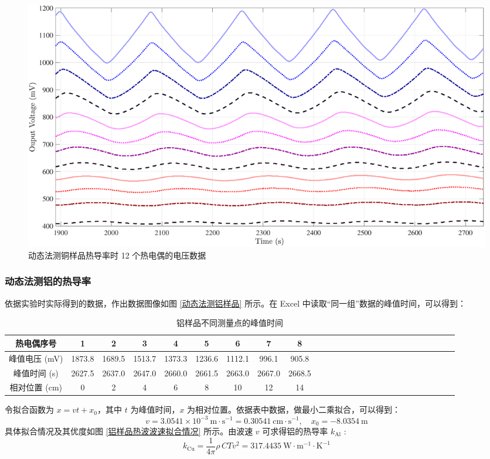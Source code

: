\documentclass[UTF8]{article}
\theoremstyle{MyLineTheoremStyle} %
\theoremstyle{MyBlockTheoremStyle} %
\theoremstyle{MySubsubsectionStyle} %
\begin{document}
\begin{figure}[H]\centering
    \includegraphics[width=\columnwidth]{assets/1 铜/2024-12-10_20-43-29.pdf}
    \caption{动态法测铜样品热导率时 12 个热电偶的电压数据}
    \label{动态法测铜样品}
\end{figure}





\subsubsection{动态法测铝的热导率}



依据实验时实际得到的数据，作出数据图像如图 \ref{动态法测铝样品} 所示。在 Excel 中读取“同一组”数据的峰值时间，可以得到：
\begin{table}[H]\centering
    \caption{铝样品不同测量点的峰值时间}
    \label{铝样品不同测量点的峰值时间}
    \begin{tabular}{cccccccccccccccccccccccccc}\toprule
        热电偶序号 & 1 & 2 & 3 & 4 & 5 & 6 & 7 & 8 \\
        \midrule
        峰值电压 (mV) &1873.8&	1689.5&	1513.7&	1373.3&	1236.6&	1112.1&	996.1 & 905.8 \\
        峰值时间 (s) &2627.5&	2637.0&	2647.0&	2660.0&	2661.5&	2663.0&	2667.0&	2668.5 \\
        相对位置 (cm) & 0 & 2 & 4 & 6 & 8 & 10 & 12 & 14 \\
        \bottomrule
    \end{tabular}
\end{table}
令拟合函数为 $x = v t +  x_0$，其中 $t$ 为峰值时间，$x$ 为相对位置。依据表中数据，做最小二乘拟合，可以得到：
\begin{equation}
v = 3.0541 \times 10 ^{-3}\ \mathrm{m\cdot s^{-1}} = 0.30541 \ \mathrm{cm\cdot s^{-1}} ,\quad x_0 = -8.0354 \ \mathrm{m}
\end{equation}
具体拟合情况及其优度如图 \ref{铝样品热波波速拟合情况} 所示。由波速 $v$ 可求得铝的热导率 $k_{\text{Al}}$ : 
\begin{equation}
k_{\text{Cu}} = \frac{1}{4 \pi} \rho \,C T v^2 = 317.4435 \ \mathrm{W\cdot m^{-1}\cdot K^{-1}}
\end{equation}
\end{document}
